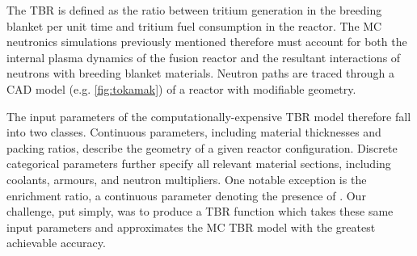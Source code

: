 The TBR is defined as the ratio between tritium generation in the breeding
blanket per unit time and tritium fuel consumption in the reactor. The MC
neutronics simulations previously mentioned therefore must account for both the
internal plasma dynamics of the fusion reactor and the resultant interactions of
neutrons with breeding blanket materials. Neutron paths are traced through a CAD
model (e.g. \cref{fig:tokamak}) of a reactor with modifiable geometry.

The input parameters of the computationally-expensive TBR model therefore fall
into two classes. Continuous parameters, including material thicknesses and
packing ratios, describe the geometry of a given reactor configuration. Discrete
categorical parameters further specify all relevant material sections, including
coolants, armours, and neutron multipliers. One notable exception is the
enrichment ratio, a continuous parameter denoting the presence of
. Our challenge, put simply, was to produce a TBR function which
takes these same input parameters and approximates the MC TBR model with the
greatest achievable accuracy.

